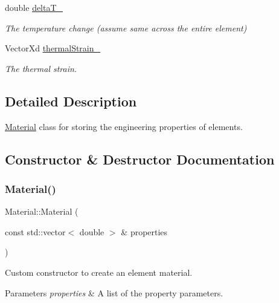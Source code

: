 \begin{DoxyCompactItemize}
\mbox{\label{class_material_a4c80934742a60ab5414e92c4b97d08ca}} 
double \mbox{\hyperlink{class_material_a4c80934742a60ab5414e92c4b97d08ca}{delta\+T\+\_\+}}
\begin{DoxyCompactList}\small\item\em The temperature change (assume same across the entire element) \end{DoxyCompactList}\item 
\mbox{\label{class_material_a26c58d90ad30a49acb8342196166ab41}} 
Vector\+Xd \mbox{\hyperlink{class_material_a26c58d90ad30a49acb8342196166ab41}{thermal\+Strain\+\_\+}}
\begin{DoxyCompactList}\small\item\em The thermal strain. \end{DoxyCompactList}\end{DoxyCompactItemize}


\subsection{Detailed Description}
\mbox{\hyperlink{class_material}{Material}} class for storing the engineering properties of elements. 



\subsection{Constructor \& Destructor Documentation}
\mbox{\label{class_material_aa37938070139aa60f67d245d3b0ce352}} 
\subsubsection{\texorpdfstring{Material()}{Material()}}
{\footnotesize\ttfamily Material\+::\+Material (\begin{DoxyParamCaption}\item[{const std\+::vector$<$ double $>$ \&}]{properties }\end{DoxyParamCaption})}



Custom constructor to create an element material. 


\begin{DoxyParams}{Parameters}
{\em properties} & A list of the property parameters. \\
\hline
\end{DoxyParams}


